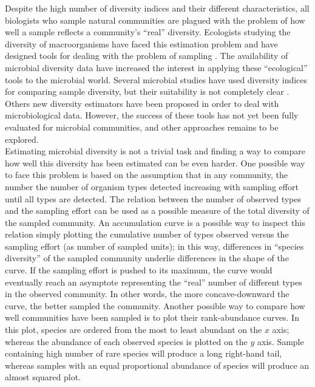 Despite the high number of diversity indices and their different characteristics, all biologists who sample natural communities are plagued with the problem of how well a sample reflects a community's ``real'' diversity. Ecologists studying the diversity of macroorganisms have faced this estimation problem and have designed tools for dealing with the problem of sampling \cite{heck1975explicit, magurran1988ecological, colwell1994estimating}. The availability of microbial diversity data have increased the interest in applying these ``ecological'' tools to the microbial world. Several microbial studies have used diversity indices for comparing sample diversity, but their suitability is not completely clear \cite{mcmurdie2014waste}. Others new diversity estimators have been proposed in order to deal with microbiological data. However, the success of these tools has not yet been fully evaluated for microbial communities, and other approaches remains to be explored.\\
Estimating microbial diversity is not a trivial task and finding a way to compare how well this diversity has been estimated can be even harder. One possible way to face this problem is based on the assumption that in any community, the number the number of organism types detected increasing with sampling effort until all types are detected. The relation between the number of observed types and the sampling effort can be used as a possible measure of the total diversity of the sampled community. An accumulation curve is a possible way to inspect this relation simply plotting the cumulative number of types observed versus the sampling effort (as number of sampled units); in this way, differences in ``species diversity'' of the sampled community underlie differences in the shape of the curve. If the sampling effort is pushed to its maximum, the curve would eventually reach an asymptote representing the ``real'' number of different types in the observed community. In other words, the more concave-downward the curve, the better sampled the community. Another possible way to compare how well communities have been sampled is to plot their rank-abundance curves. In this plot, species are ordered from the most to least abundant on the $x$ axis; whereas the abundance of each observed species is plotted on the $y$ axis. Sample containing high number of rare species will produce a long right-hand tail, whereas samples with an equal proportional abundance of species will produce an almost squared plot.\\



\backmatter
{}
\renewcommand{\sectionmark}[1]{\markright{#1}}
\sectionmark{Bibliography}
